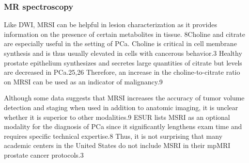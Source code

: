 \subsubsection{MR spectroscopy}
Like DWI, MRSI can be helpful in lesion characterization as it provides
information on the presence of certain metabolites in tissue. 8Choline and
citrate are especially useful in the setting of PCa. Choline is critical in
cell membrane synthesis and is thus usually elevated in cells with cancerous
behavior.3 Healthy prostate epithelium synthesizes and secretes large
quantities of citrate but levels are decreased in PCa.25,26 Therefore, an
increase in the choline-to-citrate ratio on MRSI can be used as an indicator of
malignancy.9 

Although some data suggests that MRSI increases the accuracy of tumor volume
detection and staging when used in addition to anatomic imaging, it is unclear
whether it is superior to other modalities.9 ESUR lists MSRI as an optional
modality for the diagnosis of PCa since it significantly lengthens exam time
and requires specific technical expertise.8 Thus, it is not surprising that
many academic centers in the United States do not include MSRI in their mpMRI
prostate cancer protocols.3
